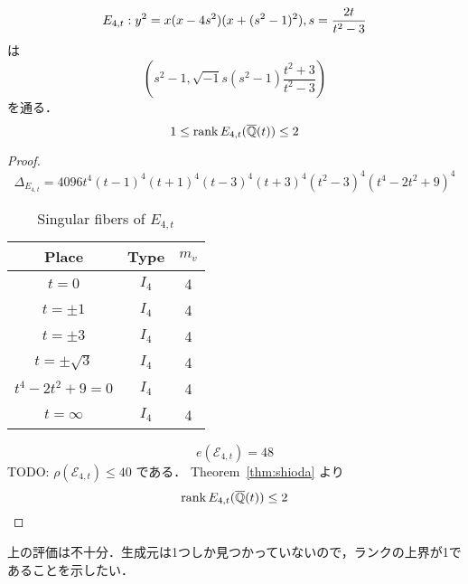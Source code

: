 \documentclass[main]{subfiles}
\begin{document}
\begin{thm}
    \begin{equation}
        \label{eq:E_{4t}}
        E_{4,t}: y^{2} = x(x - 4s^{2})(x + (s^{2} - 1)^{2}), s = \frac{2t}{t^{2} - 3}
    \end{equation}
    は
    \begin{equation}
        \left(s^{2} - 1, \sqrt{-1} s(s^{2} - 1) \frac{t^{2} + 3}{t^{2} - 3} \right)
    \end{equation}
    を通る．
    \begin{equation}
        1 \leq \operatorname{rank} E_{4,t}(\overline{\mathbb{Q}}(t)) \leq 2
    \end{equation}
\end{thm}
\begin{proof}
    \begin{equation}
        \Delta_{E_{4,t}} = 4096t^{4}(t - 1)^{4}(t + 1)^{4}(t - 3)^{4}(t + 3)^{4}(t^{2} - 3)^{4}(t^{4} - 2t^{2} + 9)^{4}
    \end{equation}
    \begin{table}[h]
        \centering
        \caption{Singular fibers of $E_{4,t}$}
        \begin{tabular}{|c|c|c|}
            \hline
            Place            & Type  & $m_v$ \\
            \hline
            $t=0$            & $I_4$ & 4     \\
            $t=\pm 1$        & $I_4$ & 4     \\
            $t=\pm 3$        & $I_4$ & 4     \\
            $t=\pm \sqrt{3}$ & $I_4$ & 4     \\
            $t^4-2t^2+9=0$   & $I_4$ & 4     \\
            $t=\infty$       & $I_4$ & 4     \\
            \hline
        \end{tabular}
    \end{table}
    \begin{equation}
        e(\mathcal{E}_{4,t}) = 48
    \end{equation}
    TODO: $\rho(\mathcal{E}_{4,t}) \leq 40$ である．
    Theorem~\ref{thm:shioda} より
    \begin{equation}
        \operatorname{rank} E_{4,t}(\overline{\mathbb{Q}}(t)) \leq 2
    \end{equation}
\end{proof}

上の評価は不十分．生成元は1つしか見つかっていないので，ランクの上界が1であることを示したい．
\end{document}
